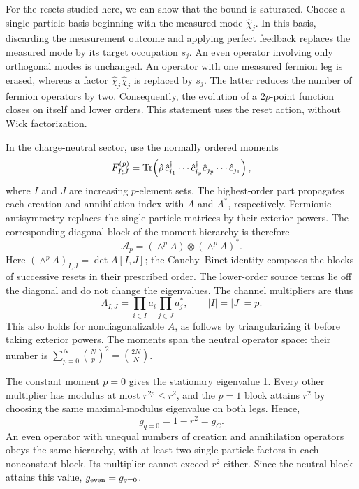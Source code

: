 \documentclass[aps,prb,10pt,twocolumn,superscriptaddress,longbibliography,floatfix]{revtex4-2}
\begin{document}
{For the resets studied here, we can show that the bound is saturated. Choose a single-particle basis beginning with the measured mode $\hat\chi_j$. In this basis, discarding the measurement outcome and applying perfect feedback replaces the measured mode by its target occupation $s_j$. An even operator involving only orthogonal modes is unchanged. An operator with one measured fermion leg is erased, whereas a factor $\hat\chi_j^\dagger\hat\chi_j$ is replaced by $s_j$. The latter reduces the number of fermion operators by two. Consequently, the evolution of a $2p$-point function closes on itself and lower orders. This statement uses the reset action, without Wick factorization.

In the charge-neutral sector, use the normally ordered moments
\begin{equation}
    F^{(p)}_{I;J}=\Tr\!\left(\hat\rho\,
    \hat c_{i_1}^\dagger\cdots\hat c_{i_p}^\dagger
    \hat c_{j_p}\cdots\hat c_{j_1}\right),
    \label{eq:NeutralMomentHierarchy}
\end{equation}
where $I$ and $J$ are increasing $p$-element sets. The highest-order part propagates each creation and annihilation index with $A$ and $A^*$, respectively. Fermionic antisymmetry replaces the single-particle matrices by their exterior powers. The corresponding diagonal block of the moment hierarchy is therefore
\begin{equation}
    \mathcal A_p=(\wedge^p A)\otimes(\wedge^p A)^*.
    \label{eq:ExteriorPowerChannel}
\end{equation}
Here $(\wedge^p A)_{I,J}=\det A[I,J]$; the Cauchy--Binet identity composes the blocks of successive resets in their prescribed order. The lower-order source terms lie off the diagonal and do not change the eigenvalues. The channel multipliers are thus
\begin{equation}
    \Lambda_{I,J}=\prod_{i\in I}a_i\prod_{j\in J}a_j^*,
    \qquad |I|=|J|=p.
    \label{eq:NeutralChannelSpectrum}
\end{equation}
This also holds for nondiagonalizable $A$, as follows by triangularizing it before taking exterior powers. The moments span the neutral operator space: their number is $\sum_{p=0}^N\binom{N}{p}^2=\binom{2N}{N}$.

The constant moment $p=0$ gives the stationary eigenvalue 1. Every other multiplier has modulus at most $r^{2p}\leq r^2$, and the $p=1$ block attains $r^2$ by choosing the same maximal-modulus eigenvalue on both legs. Hence,
\begin{equation}
    g_{q=0}=1-r^2=g_C.
    \label{eq:NeutralChannelGap}
\end{equation}
An even operator with unequal numbers of creation and annihilation operators obeys the same hierarchy, with at least two single-particle factors in each nonconstant block. Its multiplier cannot exceed $r^2$ either. Since the neutral block attains this value, $g_{\rm even}=g_{q=0}$.

}
\end{document}
